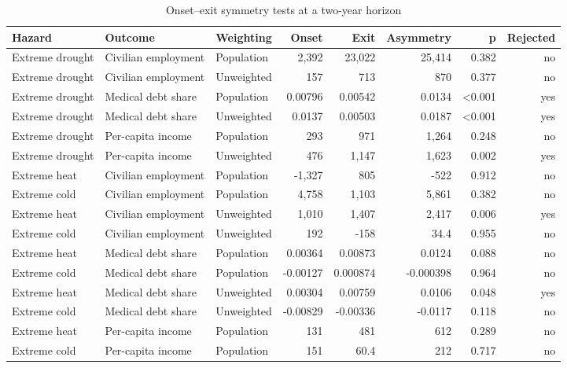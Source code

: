 \begin{table}[htbp]
\centering
\scriptsize
\setlength{\tabcolsep}{4pt}
\sloppy
\caption{Onset--exit symmetry tests at a two-year horizon}
\label{tab:e2t3}
\begin{tabularx}{\textwidth}{>{\raggedright\arraybackslash}p{2.4cm} >{\raggedright\arraybackslash}X >{\raggedright\arraybackslash}p{2.1cm} r r r r r}
\toprule
Hazard & Outcome & Weighting & Onset & Exit & Asymmetry & p & Rejected \\
\midrule
Extreme drought & Civilian employment & Population & 2,392 & 23,022 & 25,414 & 0.382 & no \\
Extreme drought & Civilian employment & Unweighted & 157 & 713 & 870 & 0.377 & no \\
Extreme drought & Medical debt share & Population & 0.00796 & 0.00542 & 0.0134 & \textless{}0.001 & yes \\
Extreme drought & Medical debt share & Unweighted & 0.0137 & 0.00503 & 0.0187 & \textless{}0.001 & yes \\
Extreme drought & Per-capita income & Population & 293 & 971 & 1,264 & 0.248 & no \\
Extreme drought & Per-capita income & Unweighted & 476 & 1,147 & 1,623 & 0.002 & yes \\
Extreme heat & Civilian employment & Population & -1,327 & 805 & -522 & 0.912 & no \\
Extreme cold & Civilian employment & Population & 4,758 & 1,103 & 5,861 & 0.382 & no \\
Extreme heat & Civilian employment & Unweighted & 1,010 & 1,407 & 2,417 & 0.006 & yes \\
Extreme cold & Civilian employment & Unweighted & 192 & -158 & 34.4 & 0.955 & no \\
Extreme heat & Medical debt share & Population & 0.00364 & 0.00873 & 0.0124 & 0.088 & no \\
Extreme cold & Medical debt share & Population & -0.00127 & 0.000874 & -0.000398 & 0.964 & no \\
Extreme heat & Medical debt share & Unweighted & 0.00304 & 0.00759 & 0.0106 & 0.048 & yes \\
Extreme cold & Medical debt share & Unweighted & -0.00829 & -0.00336 & -0.0117 & 0.118 & no \\
Extreme heat & Per-capita income & Population & 131 & 481 & 612 & 0.289 & no \\
Extreme cold & Per-capita income & Population & 151 & 60.4 & 212 & 0.717 & no \\

\end{tabularx}
\end{table}
